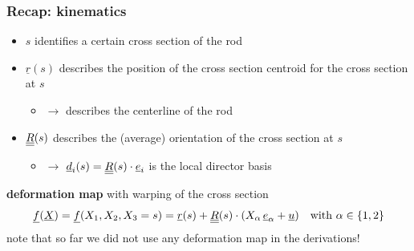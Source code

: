 \begin{frame}
  \frametitle{Recap: kinematics}

  \begin{itemize}
    \item $s$ identifies a certain cross section of the rod
    \item $\underline{r}(s)$ describes the position of the cross section centroid for the cross section at $s$
      \begin{itemize}
        \item $\rightarrow$ describes the centerline of the rod
      \end{itemize}
    \item $\underline{\underline{R}}(s)$ describes the (average) orientation of the cross section at $s$
      \begin{itemize}
        \item $\rightarrow$ $\underline{d}_i(s) = \underline{\underline{R}}(s) \cdot \underline{e}_i$ is the local director basis
      \end{itemize}
  \end{itemize}
  
  \vspace{0.6em}
  \textbf{deformation map} with warping of the cross section
  \begin{displaymath}
    \underline{f}(\underline{X}) = \underline{f}(X_1,X_2,X_3=s) = \underline{r}(s) + \underline{\underline{R}}(s) \cdot (X_{\alpha} \, \underline{e}_{\alpha} + \underline{u}) \quad \text{with } \alpha \in \{1,2\}
  \end{displaymath}
  note that so far we did not use any deformation map in the derivations!
  

\end{frame}
